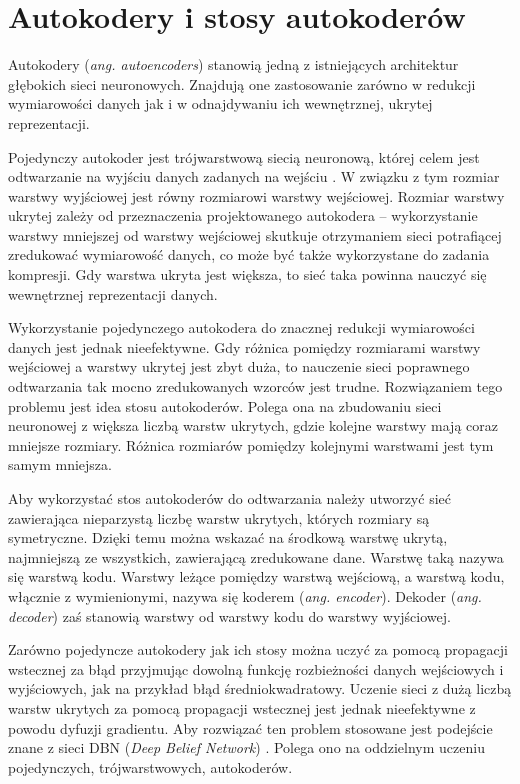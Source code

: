 \documentclass[11pt,a4paper,oneside]{report}
\begin{document}
\section{Autokodery i stosy autokoderów}
\label{sec:autoencoders}

Autokodery (\textit{ang. autoencoders}) stanowią jedną z istniejących architektur głębokich sieci neuronowych. Znajdują one zastosowanie zarówno w redukcji wymiarowości danych jak i w odnajdywaniu ich wewnętrznej, ukrytej reprezentacji. 

Pojedynczy autokoder jest trójwarstwową siecią neuronową, której celem jest odtwarzanie na wyjściu danych zadanych na wejściu \cite{hinton2006reducing}. W związku z tym rozmiar warstwy wyjściowej jest równy rozmiarowi warstwy wejściowej. Rozmiar warstwy ukrytej zależy od przeznaczenia projektowanego autokodera -- wykorzystanie warstwy mniejszej od warstwy wejściowej skutkuje otrzymaniem sieci potrafiącej zredukować wymiarowość danych, co może być także wykorzystane do zadania kompresji. Gdy warstwa ukryta jest większa, to sieć taka powinna nauczyć się wewnętrznej reprezentacji danych.

Wykorzystanie pojedynczego autokodera do znacznej redukcji wymiarowości danych jest jednak nieefektywne. Gdy różnica pomiędzy rozmiarami warstwy wejściowej a warstwy ukrytej jest zbyt duża, to nauczenie sieci poprawnego odtwarzania tak mocno zredukowanych wzorców jest trudne. Rozwiązaniem tego problemu jest idea stosu autokoderów. Polega ona na zbudowaniu sieci neuronowej z większa liczbą warstw ukrytych, gdzie kolejne warstwy mają coraz mniejsze rozmiary. Różnica rozmiarów pomiędzy kolejnymi warstwami jest tym samym mniejsza.

Aby wykorzystać stos autokoderów do odtwarzania należy utworzyć sieć zawierająca nieparzystą liczbę warstw ukrytych, których rozmiary są symetryczne. Dzięki temu można wskazać na środkową warstwę ukrytą, najmniejszą ze wszystkich, zawierającą zredukowane dane. Warstwę taką nazywa się warstwą kodu. Warstwy leżące pomiędzy warstwą wejściową, a warstwą kodu, włącznie z wymienionymi, nazywa się koderem (\textit{ang. encoder}). Dekoder (\textit{ang. decoder}) zaś stanowią warstwy od warstwy kodu do warstwy wyjściowej.

Zarówno pojedyncze autokodery jak ich stosy można uczyć za pomocą propagacji wstecznej za błąd przyjmując dowolną funkcję rozbieżności danych wejściowych i wyjściowych, jak na przykład błąd średniokwadratowy. Uczenie sieci z dużą liczbą warstw ukrytych za pomocą propagacji wstecznej jest jednak nieefektywne \cite{hinton2006reducing} z powodu dyfuzji gradientu. Aby rozwiązać ten problem stosowane jest podejście znane z sieci DBN (\textit{Deep Belief Network}) \cite{le2008representational}. Polega ono na oddzielnym uczeniu pojedynczych, trójwarstwowych, autokoderów. 
\end{document}
